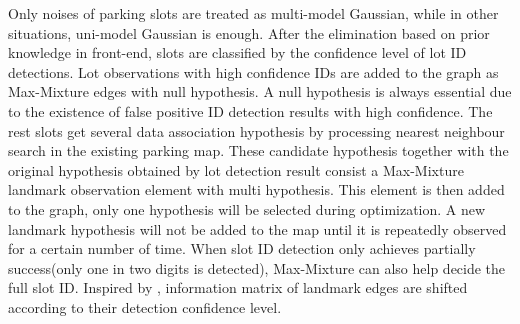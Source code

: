 \documentclass[journal]{IEEEtran}
\begin{document}
Only noises of parking slots are treated as multi-model Gaussian, while in other situations, uni-model Gaussian is enough.
After the elimination based on prior knowledge in front-end, slots are classified by the confidence level of lot ID detections. Lot observations with high confidence IDs are added to the graph as Max-Mixture edges with null hypothesis. 
A null hypothesis is always essential due to the existence of false positive ID detection results with high confidence. 
The rest slots get several data association hypothesis by processing nearest neighbour search in the existing parking map.  
These candidate hypothesis together with the original hypothesis obtained by lot detection result consist a Max-Mixture landmark observation element with multi hypothesis. 
This element is then added to the graph, only one hypothesis will be selected during optimization.
A new landmark hypothesis will not be added to the map until it is repeatedly observed for a certain number of time. 
When slot ID detection only achieves partially success(only one in two digits is detected), Max-Mixture can also help decide the full slot ID.
Inspired by \citep{Switchable constraints}, information matrix of landmark edges are shifted according to their detection confidence level.


\end{document}
